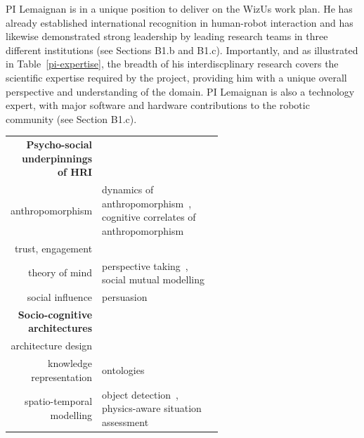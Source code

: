 \documentclass[11pt]{report}
\newcommand{\project}{WizUs\xspace}
\begin{document}
PI Lemaignan is in a unique position to deliver on the \project work plan.  He
has already established international recognition in human-robot interaction and
has likewise demonstrated strong leadership by leading research teams in three
different institutions (see Sections B1.b and B1.c). Importantly, and as
illustrated in Table~\ref{pi-expertise}, the breadth of
his interdiscplinary research covers the scientific expertise required by the
project, providing him with a unique overall perspective and understanding of
the domain. PI Lemaignan is also a technology expert, with major software and
hardware contributions to the robotic community (see Section B1.c).


\begin{table}[h]
    \centering
    \begin{tabular}{rp{0.6\linewidth}}
        \toprule
        \textbf{Psycho-social underpinnings of HRI} \\  
        anthropomorphism & \small dynamics of
        anthropomorphism~\cite{lemaignan2014dynamics}, \newline cognitive correlates of anthropomorphism~\cite{lemaignan2014cognitive} \\
        trust, engagement & \small \cite{flook2019impact,lemaignan2015youre,fink2014which} \\
        theory of mind & \small perspective taking~\cite{ros2010which, warnier2012when}, social mutual modelling~\cite{lemaignan2015mutual,dillenbourg2016symmetry} \\
        social influence & \small persuasion~\cite{winkle2019effective} \\
        \midrule
        \textbf{Socio-cognitive architectures} \\
        architecture design & \small \cite{lemaignan2017artificial, baxter2016cognitive,lemaignan2014challenges,lallee2012towards, mallet2010genom3} \\
        knowledge representation & \small
        ontologies~\cite{lemaignan2010oro, lemaignan2013explicit} \\    
        spatio-temporal modelling & \small object
        detection~\cite{wallbridge2017qualitative}, \newline physics-aware situation
        assessment~\cite{lemaignan2018underworlds,sallami2019simulation} \\
        \midrule

\end{tabular}
\end{table}
\end{document}
